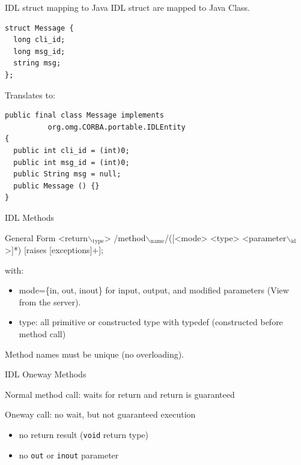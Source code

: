 \documentclass[bigger,hyperref={colorlinks=true, urlcolor=red, plainpages=false, pdfpagelabels, bookmarksnumbered}]{beamer}
\begin{document}
\begin{frame}[fragile,label=sec-4-9]{IDL struct mapping to Java}
 IDL struct are mapped to Java Class.
\lstset{language=java,label= ,caption= ,numbers=none}
\begin{lstlisting}
struct Message {
  long cli_id;
  long msg_id;
  string msg;
};
\end{lstlisting}
Translates to:
\lstset{language=java,label= ,caption= ,numbers=none}
\begin{lstlisting}
public final class Message implements
          org.omg.CORBA.portable.IDLEntity
{
  public int cli_id = (int)0;
  public int msg_id = (int)0;
  public String msg = null;
  public Message () {}
}
\end{lstlisting}
\end{frame}
\begin{frame}[label=sec-4-10]{IDL Methods}
\begin{block}{General Form}
<return$\backslash$$_{\text{type}}$> /method$\backslash$$_{\text{name}}$/([<mode> <type> <parameter$\backslash$$_{\text{id}}$>]*) [raises [exceptions]+];
\end{block}

\begin{block}{with:}
\begin{itemize}
\item mode=\{in, out, inout\} for input, output, and modified parameters (View from the server).
\item type: all primitive or constructed type with typedef (constructed before method call)
\end{itemize}

Method names must be unique (no overloading).
\end{block}
\end{frame}

\begin{frame}[fragile,label=sec-4-11]{IDL Oneway Methods}
 \begin{block}{Normal method call: waits for return and return is guaranteed}
\end{block}

\begin{block}{Oneway call: no wait, but not guaranteed execution}
\begin{itemize}
\item no return result (\texttt{void} return type)
\item no \texttt{out} or \texttt{inout} parameter
\end{itemize}
\end{block}
\end{frame}
\end{document}
